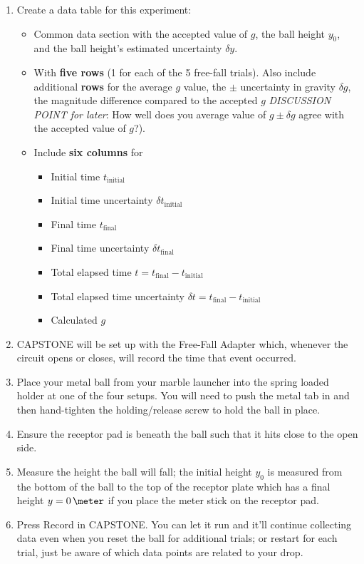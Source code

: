 \begin{enumerate}
\item Create a data table for this experiment:
\begin{itemize}
    \item Common data section with the accepted value of $g$, the ball height $y_{0}$, and the ball height's estimated uncertainty $\delta y$.
    \item With \textbf{five rows} (1 for each of the 5 free-fall trials). Also include additional \textbf{rows} for the average $g$ value, the $\pm$ uncertainty in gravity $\delta g$, the magnitude difference compared to the accepted $g$ \textit{DISCUSSION POINT for later}: How well does you average value of $g \pm \delta g$ agree with the accepted value of $g$?).
    \item Include \textbf{six columns} for
    \begin{itemize}
        \item Initial time $t_{\text{initial}}$
        \item Initial time uncertainty $\delta t_{\text{initial}}$
        \item Final time $t_{\text{final}}$
        \item Final time uncertainty $\delta t_{\text{final}}$
        \item Total elapsed time $t = t_{\text{final}} - t_{\text{initial}}$
        \item Total elapsed time uncertainty $\delta t = t_{\text{final}} - t_{\text{initial}}$
        \item Calculated $g$
    \end{itemize} 
\end{itemize}
\item CAPSTONE will be set up with the Free-Fall Adapter which, whenever the circuit opens or closes, will record the time that event occurred.
\item Place your metal ball from your marble launcher into the spring loaded holder at one of the four setups. You will need to push the metal tab in and then hand-tighten the holding/release screw to hold the ball in place.
\item Ensure the receptor pad is beneath the ball such that it hits close to the open side.
\item Measure the height the ball will fall; the initial height $y_{0}$ is measured from the bottom of the ball to the top of the receptor plate which has a final height $y = 0\,\meter$ if you place the meter stick on the receptor pad.
\item Press Record in CAPSTONE. You can let it run and it'll continue collecting data even when you reset the ball for additional trials; or restart for each trial, just be aware of which data points are related to your drop.

\end{enumerate}
